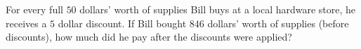 For every full $50$ dollars' worth of supplies Bill buys at a local hardware store, he receives a $5$ dollar discount. If Bill bought $846$ dollars' worth of supplies (before discounts), how much did he pay after the discounts were applied?

